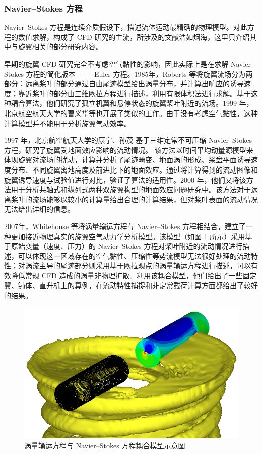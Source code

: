\subsubsection{Navier–Stokes 方程\label{sec:Navier-Stokes-Equation}}

Navier–Stokes 方程是连续介质假设下，描述流体运动最精确的物理模型。对此方程的数值求解，构成了
CFD 研究的主流，所涉及的文献浩如烟海，这里只介绍其中与旋翼相关的部分研究内容。

早期的旋翼 CFD 研究完全不考虑空气黏性的影响，因此实际上是在求解 Navier–Stokes 方程的简化版本 —— Euler
方程。1985年，Roberts 等将旋翼流场分为两部分：远离桨叶的部分通过自由尾迹模型给出涡量分布，并计算出响应的诱导速度；靠近桨叶的部分由三维欧拉方程进行描述，利用有限体积法进行求解。基于这种耦合算法，他们研究了孤立机翼和悬停状态的旋翼桨叶附近的流场。1999
年，北京航空航天大学的曹义华等也开展了类似的工作。由于没有考虑空气黏性，这种计算模型并不能用于分析旋翼气动效率。

1997 年，北京航空航天大学的康宁、孙茂 基于三维定常不可压缩 Navier–Stokes 方程，研究了旋翼受地面效应影响的流动情况。
该方法以时间平均动量源模型来体现旋翼对流场的扰动，计算并分析了尾迹畸变、地面涡的形成、桨盘平面诱导速度分布、不同旋翼离地高度及前进比下的地面效应。通过将计算得到的流动图像和旋翼诱导速度与试验值进行对比，验证了算法的适用性。2000
年，他们又将该方法用于分析共轴式和纵列式两种双旋翼构型的地面效应问题研究中。该方法对于远离桨叶的流场能够以较小的计算量给出合理的计算结果，但对桨叶表面的流动情况无法给出详细的信息。

2007年，Whitehouse 等将涡量输运方程与 Navier–Stokes 方程相结合，建立了一种更加接近物理真实的旋翼空气动力学分析模型。该模型（如图
\ref{fig:VTM-NSE} 所示）采用基于原始变量（速度、压力）的 Navier–Stokes 方程对桨叶附近的流动情况进行描述，可以体现这一区域存在的空气黏性、压缩性等势流模型无法很好处理的流动特性；对涡流主导的尾迹部分则采用基于欧拉观点的涡量输运方程进行描述，可以有效降低常规
CFD 造成的涡量非物理扩散。利用该耦合模型，他们给出了一些固定翼、钝体、直升机上的算例，在流动特性捕捉和非定常载荷计算方面都给出了较好的结果。
\begin{figure}[h!]
\centering{}\includegraphics[width=1\textwidth,height=0.26\textheight,keepaspectratio]{../review/figures/whitehouse}
\caption{\label{fig:VTM-NSE}涡量输运方程与 Navier–Stokes 方程耦合模型示意图}
\end{figure}

